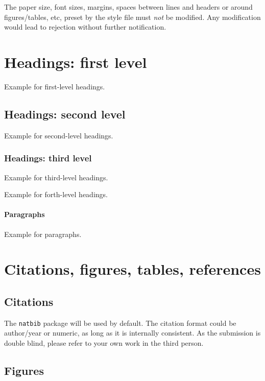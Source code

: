 \documentclass{article}
\begin{document}
The paper size, font sizes, margins, spaces between lines and headers or around 
figures/tables, etc, preset by the style file must {\em not} be modified. Any 
modification would lead to rejection without further notification.

\section{Headings: first level}

Example for first-level headings.

\subsection{Headings: second level}

Example for second-level headings.

\subsubsection{Headings: third level}

Example for third-level headings.


Example for forth-level headings.

\paragraph{Paragraphs}

Example for paragraphs.

\section{Citations, figures, tables, references}

\subsection{Citations} 

The \verb+natbib+ package will be used by default. The citation format could be 
author/year or numeric, as long as it is internally consistent. As the 
submission is double blind, please refer to your own work in the third person.

\subsection{Figures}
\end{document}
